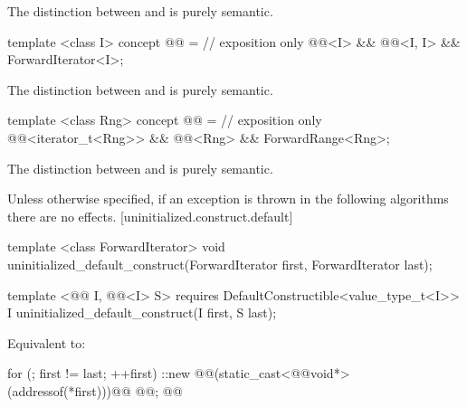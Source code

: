 {\begin{itemdescr}
\pnum
\enternote The distinction between  and
 is purely semantic.\exitnote
\end{itemdescr}

\begin{itemdecl}
template <class I>
concept @@ = // exposition only
  @@<I> &&
  @@<I, I> &&
  ForwardIterator<I>;
\end{itemdecl}

\begin{itemdescr}
\pnum
\enternote The distinction between  and
 is purely semantic.\exitnote
\end{itemdescr}

\begin{itemdecl}
template <class Rng>
concept @@ = // exposition only
  @@<iterator_t<Rng>> &&
  @@<Rng> &&
  ForwardRange<Rng>;
\end{itemdecl}

\begin{itemdescr}
\pnum
\enternote The distinction between  and
 is purely semantic.\exitnote
\end{itemdescr}
} %

Unless otherwise specified, if an exception is thrown in the following algorithms there are no effects.
[uninitialized.construct.default]{}
{\color{remclr}
\begin{codeblock}
template <class ForwardIterator>
  void uninitialized_default_construct(ForwardIterator first, ForwardIterator last);
\end{codeblock}
} %

{\color{addclr}
\begin{codeblock}
template <@@ I, @@<I> S>
  requires
DefaultConstructible<value_type_t<I>>
  I uninitialized_default_construct(I first, S last);
\end{codeblock}
} %

\setcounter{Paras}{0}
\pnum
\effects Equivalent to:
\begin{codeblock}
    for (; first != last; ++first)
      ::new @@(static_cast<@@void*>(addressof(*first)))@\added{)}@
        @@;
    @@
\end{codeblock}

